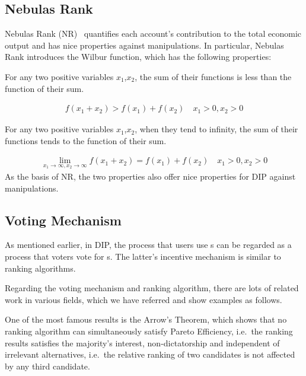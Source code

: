 \subsection{Nebulas Rank}
\noindent
Nebulas Rank (NR)~\cite{Nebulasyellowpaper} quantifies each account's contribution to the total economic output and has nice properties against manipulations. In particular, Nebulas Rank introduces the Wilbur function, which has the following properties:

\begin{property}
	\label{prop:one}
	For any two positive variables $x_1$,$x_2$, the sum of their functions is less than the function of their sum.
\end{property}
\begin{align}
	f(x_1+x_2)>f(x_1)+f(x_2) \quad x_1>0,x_2>0
\end{align}
\begin{property}
	\label{prop:two}
	For any two positive variables $x_1$,$x_2$, when they tend to infinity, the sum of their functions tends to the function of their sum.
\end{property}

\begin{align}
	\lim\limits_{x_1 \to \infty, x_2\to \infty} f(x_1+x_2) = f(x_1) + f(x_2)\quad x_1>0, x_2>0
\end{align}
\noindent As the basis of NR, the two properties also offer nice properties for DIP against manipulations.

\subsection{Voting Mechanism}
\noindent
As mentioned earlier, in DIP, the process that users use {\dapp}s can be
regarded as a process that voters vote for {\dapp}s. The latter's incentive mechanism is similar to ranking algorithms.

Regarding the voting mechanism and ranking algorithm, there are lots of related work in various fields, which we have referred and show examples as follows.

One of the most famous results is the Arrow's Theorem, which shows that no
ranking algorithm can simultaneously satisfy Pareto Efficiency, i.e.\, the
ranking results satisfies the majority's interest, non-dictatorship and
independent of irrelevant alternatives, i.e.\ the relative ranking of two candidates is not affected by any third candidate.

